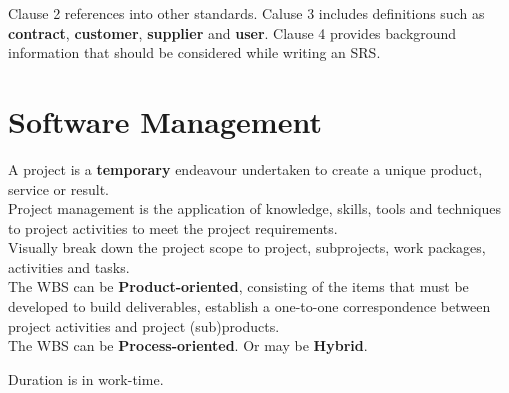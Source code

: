 \documentclass[11pt,a4paper,twocolumn]{book}
\begin{document}
Clause 2 references into other standards. Caluse 3 includes definitions such as \textbf{contract}, \textbf{customer}, \textbf{supplier} and \textbf{user}. Clause 4 provides background information that should be considered while writing an SRS.

\chapter{Software Management}

A project is a \textbf{temporary} endeavour undertaken to create a unique product, service or result.\\

Project management is the application of knowledge, skills, tools and techniques to project activities to meet the project requirements.\\

Visually break down the project scope to project, subprojects, work packages, activities and tasks.\\

The WBS can be \textbf{Product-oriented}, consisting of the items that must be developed to build deliverables, establish a one-to-one correspondence between project activities and project (sub)products.\\

The WBS can be \textbf{Process-oriented}. Or may be \textbf{Hybrid}.

Duration is in work-time.
\end{document}
